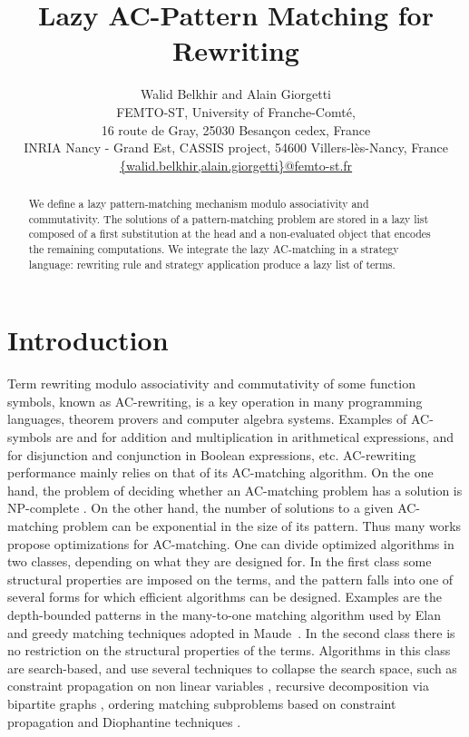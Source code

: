 \documentclass[submission,copyright,creativecommons]{eptcs}
\title{Lazy AC-Pattern Matching for Rewriting}
\author{Walid Belkhir and Alain Giorgetti\\
 FEMTO-ST, University of Franche-Comt\'{e},\\
  16 route de Gray, 25030 Besan\c{c}on cedex, France\\
INRIA Nancy - Grand Est, CASSIS project, 54600 Villers-l\`es-Nancy,
France\\
\url{{walid.belkhir,alain.giorgetti}@femto-st.fr}\\
}
\numberwithin{subcase}{case}
\begin{document}
\maketitle

\setlength{\abovecaptionskip}{-0.5cm}
\setlength{\belowcaptionskip}{-0.2cm}

\begin{abstract}
We define a lazy pattern-matching  mechanism  modulo associativity and commutativity. 
The solutions of a pattern-matching problem are stored in a lazy list composed of 
a first substitution at the head and  a non-evaluated object  that encodes  the
remaining  computations. We integrate the lazy AC-matching in a strategy language: 
 rewriting rule and strategy application produce a lazy list of terms.  
\end{abstract}

\section{Introduction}\label{Introduction:Sec}
Term rewriting modulo associativity and commutativity of some function symbols,
known as AC-rewri\-ting, is a key operation in many programming languages,
theorem provers and computer algebra systems. Examples of AC-symbols are  and
 for addition and multiplication in arithmetical expressions,  and
 for disjunction and conjunction in Boolean expressions, etc.
AC-rewriting performance mainly relies on that of its AC-matching algorithm. On
the one hand, the problem of deciding whether an AC-matching problem has a
solution is NP-complete \cite{Benanav:1985:CMP}. On the other hand, the number of
solutions to a given AC-matching problem can be exponential in the size of its
pattern. Thus many works propose optimizations for AC-matching. One can divide
optimized algorithms in two classes, depending on what they are designed for. In
the first class  some structural properties are imposed on the terms, and the
pattern falls into one of several forms for which efficient algorithms can be
designed. Examples are the depth-bounded patterns in the many-to-one matching
algorithm used by Elan~\cite{Kirchner:2001:Promoting:AC} and greedy matching
techniques adopted in Maude~\cite{MaudeBook07}. In the second class there is no
restriction on the structural properties of the terms. Algorithms in this class
are search-based, and use several techniques to collapse the search space, such
as constraint propagation on non linear variables \cite{gramlich-unif88},
recursive decomposition via bipartite graphs \cite{Bipartie-Eker95}, ordering
matching subproblems based on constraint propagation \cite{Fast-Eker96}
 and Diophantine techniques \cite{Single-Eker02}.
 
\end{document}
